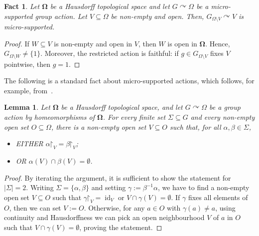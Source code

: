 \documentclass{article}
\newtheorem{lemma}[theorem]{Lemma}
\newtheorem{fact}[theorem]{Fact}
\theoremstyle{remark}
\theoremstyle{definition}
\def\acts{\curvearrowright}
\newcommand{\spOm}{\bm{\Omega}}
\begin{document}
{\begin{fact}\label{fact:local-lawlessness} Let $\spOm$ be a Hausdorff topological space and let $G\acts \Omega$ be a micro-supported group action. Let $V\subseteq \Omega$ be non-empty and open. Then,  $G_{\Omega\setminus V}\acts V$ is micro-supported.
\end{fact}
\begin{proof}
If
$W\subseteq V$ is non-empty and open in $V$, then $W$ is open in $\spOm$. Hence, $G_{\Omega\setminus W}\neq \{1\}$. {Moreover, the restricted action is faithful: if $g\in G_{\Omega\setminus V}$ fixes $V$ pointwise, then $g=1$.}
%
\end{proof}

The following is a standard fact about micro-supported actions, which follows, for example, from~\cite[Lemma 6.5.(2)]{kim2021structure}.

\begin{lemma}\label{lem:finite-germ-separation} Let $\spOm$ be a Hausdorff topological space, and let $G\acts \Omega$ be a group action by homeomorphisms of $\spOm$.  For every finite
set $\Sigma\subseteq G$ and every non-empty open set {$O\subseteq \Omega$},
there is a
non-empty open set $V\subseteq {O}$
 such that, for all $\alpha,
\beta\in\Sigma$,
\begin{itemize}
    \item EITHER $\alpha\mathord\upharpoonright_V=\beta\mathord\upharpoonright_V$; 
    \item OR $\alpha(V)\cap \beta(V)=\emptyset$.
\end{itemize}
\end{lemma}

\begin{proof}
By iterating the argument, it is sufficient to show the statement for $|\Sigma|=2$. Writing $\Sigma=\{\alpha,\beta\}$ and setting $\gamma:=\beta^{-1}\alpha$, we have to find a non-empty open set $V\subseteq O$ such that $\gamma\mathord\upharpoonright_V=\operatorname{id}_V$ or $V\cap \gamma(V)=\emptyset$. {If $\gamma$ {fixes}
all elements of $O$, then we can set $V:=O$. Otherwise, for any $a\in O$ with $\gamma(a)\neq a$, using continuity and Hausdorffness we can pick an open neighbourhood $V$ of $a$ in $O$ such that $V\cap \gamma(V)=\emptyset$, proving the statement.}
\end{proof}

}
\end{document}
